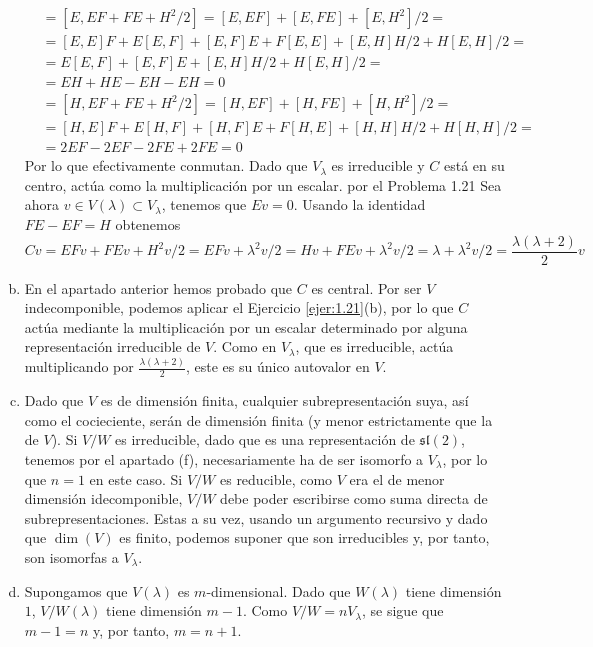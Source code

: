 \documentclass[twoside]{article}
\begin{document}
\begin{solucion}
\begin{enumerate}[(a)]
\begin{align*}
[E,C]&=[E, EF + FE + H^2/2]=[E,EF]+[E,FE]+[E,H^2]/2=\\
&=[E,E]F+E[E,F]+[E,F]E+F[E,E]+[E,H]H/2+H[E,H]/2=\\
&=E[E,F]+[E,F]E+[E,H]H/2+H[E,H]/2=\\
&=EH+HE-EH-EH=0
\end{align*}
\begin{align*}
[H,C]&=[H, EF + FE + H^2/2]=[H,EF]+[H,FE]+[H,H^2]/2=\\
&=[H,E]F+E[H,F]+[H,F]E+F[H,E]+[H,H]H/2+H[H,H]/2=\\
&=2EF-2EF-2FE+2FE=0
\end{align*}
Por lo que efectivamente conmutan. Dado que $V_\lambda$ es irreducible y $C$ está en su centro, actúa como la multiplicación por un escalar. por el Problema 1.21 Sea ahora $v\in V(\lambda)\subset V_\lambda$, tenemos que $Ev=0$. Usando la identidad $FE-EF=H$ obtenemos
\[
Cv=EFv+FEv+H^2v/2=EFv+\lambda^2v/2=Hv+FEv+\lambda^2v/2=\lambda+\lambda^2v/2=\frac{\lambda(\lambda+2)}{2}v
\]

\item En el apartado anterior hemos probado que $C$ es central. Por ser $V$ indecomponible, podemos aplicar el Ejercicio \ref{ejer:1.21}(b), por lo que $C$ actúa mediante la multiplicación por un escalar determinado por alguna representación irreducible de $V$. Como en $V_\lambda$, que es irreducible, actúa multiplicando por $\frac{\lambda(\lambda+2)}{2}$, este es su único autovalor en $V$. 
\item Dado que $V$ es de dimensión finita, cualquier subrepresentación suya, así como el cocieciente, serán de dimensión finita (y menor estrictamente que la de $V$). Si $V/W$ es irreducible, dado que es una representación de $\mathfrak{sl}(2)$, tenemos por el apartado (f), necesariamente ha de ser isomorfo a $V_\lambda$, por lo que $n=1$ en este caso. Si $V/W$ es reducible, como $V$ era el de menor dimensión idecomponible, $V/W$ debe poder escribirse como suma directa de subrepresentaciones. Estas a su vez, usando un argumento recursivo y dado que $\dim(V)$ es finito, podemos suponer que son irreducibles y, por tanto, son isomorfas a $V_\lambda$.
\item Supongamos que $V(\lambda)$ es $m$-dimensional. Dado que $W(\lambda)$ tiene dimensión $1$, $V/W(\lambda)$ tiene dimensión $m-1$. Como $V/W = nV_\lambda$, se sigue que $m-1 = n$ y, por tanto, $m=n+1$.


\end{enumerate}
\end{solucion}
\end{document}

